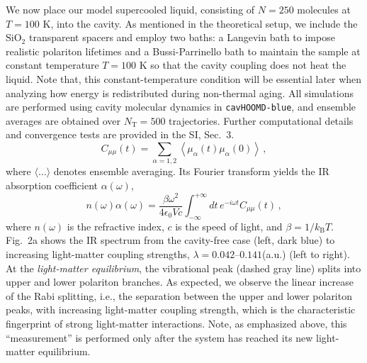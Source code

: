 \documentclass[aps, prl,
 reprint,
 superscriptaddress,
 citeautoscript,  %
 amsmath,amssymb,
 tightenlines
]{revtex4-2}
\begin{document}
We now place our model supercooled liquid, consisting of $N=250$ molecules at $T=100$ K, into the cavity. As mentioned in the theoretical setup, we include the $\mathrm{SiO_2}$ transparent spacers and employ two baths: a Langevin bath to impose realistic polariton lifetimes and a Bussi-Parrinello bath to maintain the sample at constant temperature $T=100$ K so that the cavity coupling does not heat the liquid. Note that, this constant-temperature condition will be essential later when analyzing how energy is redistributed during non-thermal aging. All simulations are performed using cavity molecular dynamics in \texttt{cavHOOMD-blue}, and ensemble averages are obtained over $N_\mathrm{T} = 500$ trajectories. Further computational details and convergence tests are provided in the SI, Sec.~3.%
\begin{equation}
C_{\mu\mu} (t) = \sum_{\alpha=1,2} \left\langle \mu_\alpha(t) \mu_\alpha(0) \right\rangle \,,
\end{equation}
where $\langle \ldots \rangle$ denotes ensemble averaging. Its Fourier transform yields the IR absorption coefficient $\alpha(\omega)$,
\begin{equation}
n(\omega) \alpha(\omega) = \frac{\beta \omega^2}{4 \epsilon_0 V c} \int_{-\infty}^{+\infty} \!\!\!\! dt \, e^{-i \omega t} C_{\mu\mu}(t)  \,, \label{eq:irspectrum}
\end{equation}
where $n(\omega)$ is the refractive index, $c$ is the speed of light, and $\beta = 1/k_\mathrm{B} T$. Fig.~2a shows the IR spectrum from the cavity-free case (left, dark blue) to increasing light-matter coupling strengths, $\lambda = 0.042$--$0.141$(a.u.) (left to right). At the \emph{light-matter equilibrium}, the vibrational peak (dashed gray line) splits into upper and lower polariton branches. As expected, we observe the linear increase of the Rabi splitting, i.e., the separation between the upper and lower polariton peaks, with increasing light-matter coupling strength, which is the characteristic fingerprint of strong light-matter interactions. Note, as emphasized above, this ``measurement'' is performed only after the system has reached its new light-matter equilibrium. 
\end{document}
